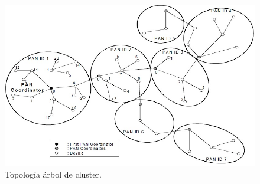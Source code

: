 \begin{figure}[h!]
	\centering
    \includegraphics[width=.8\textwidth]{./Figures/cluster.jpg}
    	\caption{Topología árbol de cluster.}
	\label{fig:clust}
\end{figure}



